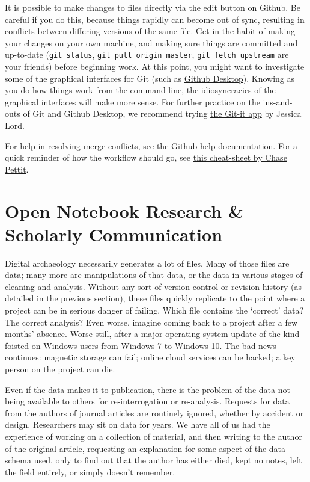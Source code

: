 \documentclass[english,]{book}
\begin{document}
It is possible to make changes to files directly via the edit button on
Github. Be careful if you do this, because things rapidly can become out
of sync, resulting in conflicts between differing versions of the same
file. Get in the habit of making your changes on your own machine, and
making sure things are committed and up-to-date (\texttt{git\ status},
\texttt{git\ pull\ origin\ master}, \texttt{git\ fetch\ upstream} are
your friends) before beginning work. At this point, you might want to
investigate some of the graphical interfaces for Git (such as
\href{https://desktop.github.com/}{Github Desktop}). Knowing as you do
how things work from the command line, the idiosyncracies of the
graphical interfaces will make more sense. For further practice on the
ins-and-outs of Git and Github Desktop, we recommend trying
\href{https://github.com/jlord/git-it-electron/}{the Git-it app} by
Jessica Lord.

For help in resolving merge conflicts, see the
\href{https://help.github.com/articles/resolving-a-merge-conflict-using-the-command-line/}{Github
help documentation}. For a quick reminder of how the workflow should go,
see
\href{https://gist.github.com/shawngraham/513d4b2860d52fdac6bd783e4387957e}{this
cheat-sheet by Chase Pettit}.

\hypertarget{open-notebook-research-scholarly-communication}{\section{Open
Notebook Research \& Scholarly
Communication}\label{open-notebook-research-scholarly-communication}}

Digital archaeology necessarily generates a lot of files. Many of those
files are data; many more are manipulations of that data, or the data in
various stages of cleaning and analysis. Without any sort of version
control or revision history (as detailed in the previous section), these
files quickly replicate to the point where a project can be in serious
danger of failing. Which file contains the `correct' data? The correct
analysis? Even worse, imagine coming back to a project after a few
months' absence. Worse still, after a major operating system update of
the kind foisted on Windows users from Windows 7 to Windows 10. The bad
news continues: magnetic storage can fail; online cloud services can be
hacked; a key person on the project can die.

Even if the data makes it to publication, there is the problem of the
data not being available to others for re-interrogation or re-analysis.
Requests for data from the authors of journal articles are routinely
ignored, whether by accident or design. Researchers may sit on data for
years. We have all of us had the experience of working on a collection
of material, and then writing to the author of the original article,
requesting an explanation for some aspect of the data schema used, only
to find out that the author has either died, kept no notes, left the
field entirely, or simply doesn't remember.
\end{document}

